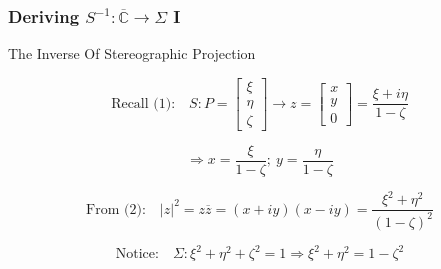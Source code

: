\documentclass[24pt]{beamer}
\begin{document}
\begin{frame}
\frametitle{Deriving $S^{-1}:\overline{\mathbb{C}}\to\Sigma$ I}

\begin{block}{The Inverse Of Stereographic Projection}

\[\mbox{Recall (1):}\quad S:P=\begin{bmatrix}\xi\\\eta\\\zeta\end{bmatrix}\to z=\begin{bmatrix}x\\y\\0\end{bmatrix}=\frac{\xi+i\eta}{1-\zeta}\]

\begin{equation}
\Rightarrow x=\frac{\xi}{1-\zeta};\ y=\frac{\eta}{1-\zeta}
\end{equation}

\[\mbox{From (2):}\quad |z|^2=z\overline{z}=(x+iy)(x-iy)=\frac{\xi^2+\eta^2}{(1-\zeta)^2}\]

\begin{equation}
\mbox{Notice:}\quad\Sigma:\xi^2+\eta^2+\zeta^2=1\Rightarrow\xi^2+\eta^2=1-\zeta^2
\end{equation}

\end{block}
\end{frame}
\end{document}
